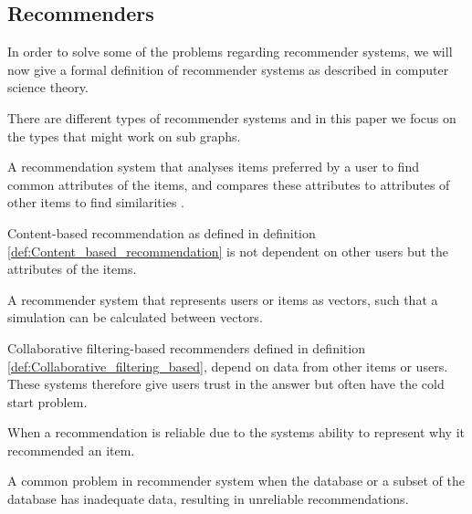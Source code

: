 \subsection{Recommenders}
In order to solve some of the problems regarding recommender systems, we will now give a formal definition of recommender systems as described in computer science theory. 

There are different types of recommender systems and in this paper we focus on the types that might work on sub graphs.

\begin{definition} \label{def:Content_based_recommendation}
A recommendation system that analyses items preferred by a user to find common attributes of the items, and compares these attributes to attributes of other items to find similarities \cite{lu2015recommender}. 
\end{definition}

Content-based recommendation as defined in definition  \autoref{def:Content_based_recommendation} is not dependent on other users but the attributes of the items.

\begin{definition}\label{def:Collaborative_filtering_based}
A recommender system that represents users or items as vectors, such that a simulation can be calculated between vectors\cite{lu2015recommender}.
\end{definition}

Collaborative filtering-based recommenders defined in definition \autoref{def:Collaborative_filtering_based}, depend on data from other items or users. These systems therefore give users trust in the answer but often have the cold start problem.

\begin{definition}[Trust]\label{def:trust}
When a recommendation is reliable due to the systems ability to represent why it recommended an item\cite{Ricci2015}.
\end{definition}

\begin{definition}\label{def:cold_start_problem}
A common problem in recommender system when the database or a subset of the database has inadequate data, resulting in unreliable recommendations\cite{Ricci2015}.
\end{definition}
